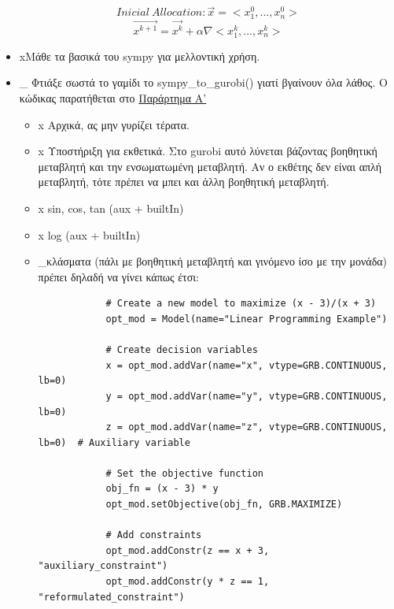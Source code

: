 \documentclass[a4paper,twoside,10pt]{article}
\begin{document}
\begin{itemize}[label={}]
	$$Inicial\  Allocation: \vec{x} = <x_1^0, ... , x_n^0> $$
	$$\vec{x^{k+1}} = \vec{x^{k}} + \alpha \nabla<x_1^k, ... , x_n^k> $$
	\item \lbrack x\rbrack Μάθε τα βασικά του sympy για μελλοντική χρήση.
	\item \lbrack \_ \rbrack Φτιάξε σωστά το γαμίδι το sympy\_to\_gurobi() γιατί βγαίνουν όλα λάθος.
	Ο κώδικας παρατήθεται στο \hyperref[firstappendix]{Παράρτημα Α'}
	\begin{itemize}[label={}]
		\item \lbrack x \rbrack Αρχικά, ας μην γυρίζει τέρατα.
		\item \lbrack x \rbrack Υποστήριξη για εκθετικά. Στο gurobi αυτό λύνεται βάζοντας βοηθητική μεταβλητή και την ενσωματωμένη μεταβλητή. Αν ο εκθέτης δεν είναι απλή μεταβλητή, τότε πρέπει να μπει και άλλη βοηθητική μεταβλητή.
		\item \lbrack x \rbrack sin, cos, tan (aux + builtIn)
		\item \lbrack x \rbrack log (aux + builtIn)
		\item \lbrack\_\rbrack κλάσματα (πάλι με βοηθητική μεταβλητή και γινόμενο ίσο με την μονάδα) πρέπει δηλαδή να γίνει κάπως έτσι:
		\begin{lstlisting}
			# Create a new model to maximize (x - 3)/(x + 3)
			opt_mod = Model(name="Linear Programming Example")
			
			# Create decision variables
			x = opt_mod.addVar(name="x", vtype=GRB.CONTINUOUS, lb=0)
			y = opt_mod.addVar(name="y", vtype=GRB.CONTINUOUS, lb=0)
			z = opt_mod.addVar(name="z", vtype=GRB.CONTINUOUS, lb=0)  # Auxiliary variable
			
			# Set the objective function
			obj_fn = (x - 3) * y
			opt_mod.setObjective(obj_fn, GRB.MAXIMIZE)
			
			# Add constraints
			opt_mod.addConstr(z == x + 3, "auxiliary_constraint")
			opt_mod.addConstr(y * z == 1, "reformulated_constraint")
			

\end{lstlisting}
\end{itemize}
\end{itemize}
\end{document}
